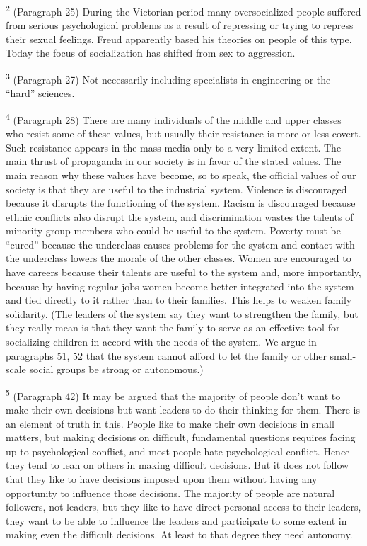 \documentclass{article}
\begin{document}
\textsuperscript{2} (Paragraph 25) During the Victorian period many oversocialized people suffered from serious 
psychological problems as a result of repressing or trying to repress their sexual feelings. Freud 
apparently based his theories on people of this type. Today the focus of socialization has shifted 
from sex to aggression. \vspace{\baselineskip}

\textsuperscript{3} (Paragraph 27) Not necessarily including specialists in engineering or the “hard” sciences. \vspace{\baselineskip}

\textsuperscript{4} (Paragraph 28) There are many individuals of the middle and upper classes who resist some of 
these values, but usually their resistance is more or less covert. Such resistance appears in the 
mass media only to a very limited extent. The main thrust of propaganda in our society is in 
favor of the stated values. The main reason why these values have become, so to speak, the 
official values of our society is that they are useful to the industrial system. Violence is 
discouraged because it disrupts the functioning of the system. Racism is discouraged because 
ethnic conflicts also disrupt the system, and discrimination wastes the talents of minority-group 
members who could be useful to the system. Poverty must be “cured” because the underclass 
causes problems for the system and contact with the underclass lowers the morale of the other 
classes. Women are encouraged to have careers because their talents are useful to the system 
and, more importantly, because by having regular jobs women become better integrated into the 
system and tied directly to it rather than to their families. This helps to weaken family 
solidarity. (The leaders of the system say they want to strengthen the family, but they really 
mean is that they want the family to serve as an effective tool for socializing children in accord 
with the needs of the system. We argue in paragraphs 51, 52 that the system cannot afford to let 
the family or other small-scale social groups be strong or autonomous.) \vspace{\baselineskip}

\textsuperscript{5} (Paragraph 42) It may be argued that the majority of people don’t want to make their own 
decisions but want leaders to do their thinking for them. There is an element of truth in 
this. People like to make their own decisions in small matters, but making decisions on difficult, 
fundamental questions requires facing up to psychological conflict, and most people hate 
psychological conflict. Hence they tend to lean on others in making difficult decisions. But it 
does not follow that they like to have decisions imposed upon them without having any 
opportunity to influence those decisions. The majority of people are natural followers, not 
leaders, but they like to have direct personal access to their leaders, they want to be able to 
influence the leaders and participate to some extent in making even the difficult decisions. At 
least to that degree they need autonomy. \vspace{\baselineskip}
\end{document}
